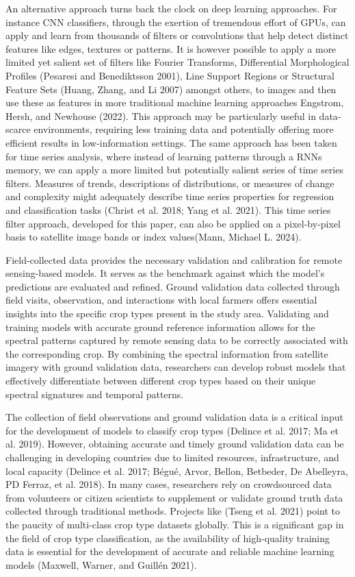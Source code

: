 \documentclass[
  journal,
  twocolumn]{IEEEtran}
\begin{document}
An alternative approach turns back the clock on deep learning
approaches. For instance CNN classifiers, through the exertion of
tremendous effort of GPUs, can apply and learn from thousands of filters
or convolutions that help detect distinct features like edges, textures
or patterns. It is however possible to apply a more limited yet salient
set of filters like Fourier Transforms, Differential Morphological
Profiles (Pesaresi and Benediktsson 2001), Line Support Regions or
Structural Feature Sets (Huang, Zhang, and Li 2007) amongst others, to
images and then use these as features in more traditional machine
learning approaches Engstrom, Hersh, and Newhouse (2022). This approach
may be particularly useful in data-scarce environments, requiring less
training data and potentially offering more efficient results in
low-information settings. The same approach has been taken for time
series analysis, where instead of learning patterns through a RNNs
memory, we can apply a more limited but potentially salient series of
time series filters. Measures of trends, descriptions of distributions,
or measures of change and complexity might adequately describe time
series properties for regression and classification tasks (Christ et al.
2018; Yang et al. 2021). This time series filter approach, developed for
this paper, can also be applied on a pixel-by-pixel basis to satellite
image bands or index values(Mann, Michael L. 2024).

Field-collected data provides the necessary validation and calibration
for remote sensing-based models. It serves as the benchmark against
which the model's predictions are evaluated and refined. Ground
validation data collected through field visits, observation, and
interactions with local farmers offers essential insights into the
specific crop types present in the study area. Validating and training
models with accurate ground reference information allows for the
spectral patterns captured by remote sensing data to be correctly
associated with the corresponding crop. By combining the spectral
information from satellite imagery with ground validation data,
researchers can develop robust models that effectively differentiate
between different crop types based on their unique spectral signatures
and temporal patterns.

The collection of field observations and ground validation data is a
critical input for the development of models to classify crop types
(Delince et al. 2017; Ma et al. 2019). However, obtaining accurate and
timely ground validation data can be challenging in developing countries
due to limited resources, infrastructure, and local capacity (Delince et
al. 2017; Bégué, Arvor, Bellon, Betbeder, De Abelleyra, PD Ferraz, et
al. 2018). In many cases, researchers rely on crowdsourced data from
volunteers or citizen scientists to supplement or validate ground truth
data collected through traditional methods. Projects like (Tseng et al.
2021) point to the paucity of multi-class crop type datasets globally.
This is a significant gap in the field of crop type classification, as
the availability of high-quality training data is essential for the
development of accurate and reliable machine learning models (Maxwell,
Warner, and Guillén 2021).
\end{document}
